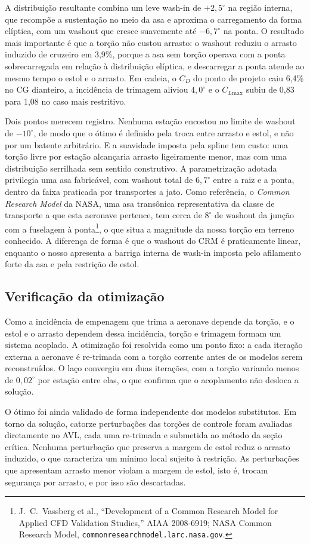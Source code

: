 A distribuição resultante combina um leve wash-in de $+2{,}5^\circ$ na
região interna, que recompõe a sustentação no meio da asa e aproxima o
carregamento da forma elíptica, com um washout que cresce suavemente até
$-6{,}7^\circ$ na ponta. O resultado mais importante é que a torção não
custou arrasto: o washout reduziu o arrasto induzido de cruzeiro em 3,9\%,
porque a asa sem torção operava com a ponta sobrecarregada em relação à
distribuição elíptica, e descarregar a ponta atende ao mesmo tempo o
estol e o arrasto. Em cadeia, o $C_D$ do ponto de projeto caiu 6,4\% no
CG dianteiro, a incidência de trimagem aliviou $4{,}0^\circ$ e o
$C_{L\mathrm{max}}$ subiu de 0,83 para 1,08 no caso mais restritivo.

Dois pontos merecem registro. Nenhuma estação encostou no limite de
washout de $-10^\circ$, de modo que o ótimo é definido pela troca entre
arrasto e estol, e não por um batente arbitrário. E a suavidade imposta
pela spline tem custo: uma torção livre por estação alcançaria arrasto
ligeiramente menor, mas com uma distribuição serrilhada sem sentido
construtivo. A parametrização adotada privilegia uma asa fabricável, com
washout total de $6{,}7^\circ$ entre a raiz e a ponta, dentro da faixa
praticada por transportes a jato. Como referência, o \textit{Common
Research Model} da NASA, uma asa transônica representativa da classe de
transporte a que esta aeronave pertence, tem cerca de $8^\circ$ de washout
da junção com a fuselagem à ponta\footnote{J.~C.~Vassberg et al.,
``Development of a Common Research Model for Applied CFD Validation
Studies,'' AIAA 2008-6919; NASA Common Research Model,
\texttt{commonresearchmodel.larc.nasa.gov}.}, o que situa a magnitude da
nossa torção em terreno conhecido. A diferença de forma é que o washout do
CRM é praticamente linear, enquanto o nosso apresenta a barriga interna de
wash-in imposta pelo afilamento forte da asa e pela restrição de estol.

\subsection*{Verificação da otimização}

Como a incidência de empenagem que trima a aeronave depende da torção, e o
estol e o arrasto dependem dessa incidência, torção e trimagem formam um
sistema acoplado. A otimização foi resolvida como um ponto fixo: a cada
iteração externa a aeronave é re-trimada com a torção corrente antes de os
modelos serem reconstruídos. O laço convergiu em duas iterações, com a
torção variando menos de $0{,}02^\circ$ por estação entre elas, o que
confirma que o acoplamento não desloca a solução.

O ótimo foi ainda validado de forma independente dos modelos substitutos.
Em torno da solução, catorze perturbações das torções de controle foram
avaliadas diretamente no AVL, cada uma re-trimada e submetida ao método da
seção crítica. Nenhuma perturbação que preserva a margem de estol reduz o
arrasto induzido, o que caracteriza um mínimo local sujeito à restrição. As
perturbações que apresentam arrasto menor violam a margem de estol, isto é,
trocam segurança por arrasto, e por isso são descartadas.
